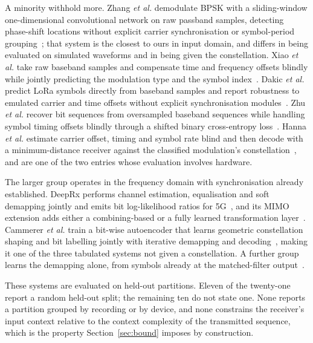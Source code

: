 \documentclass{ieeeaccess}
\begin{document}
A minority withhold more. Zhang \textit{et al.} demodulate BPSK with a
sliding-window one-dimensional convolutional network on raw passband samples,
detecting phase-shift locations without explicit carrier synchronisation or
symbol-period grouping~\cite{Zhang2018Enhanced}; that system is the closest to
ours in input domain, and differs in being evaluated on simulated waveforms and
in being given the constellation. Xiao \textit{et al.} take raw baseband samples
and compensate time and frequency offsets blindly while jointly predicting the
modulation type and the symbol index~\cite{Xiao2023_UnifiedDeep}. Dakic
\textit{et al.} predict LoRa symbols directly from baseband samples and report
robustness to emulated carrier and time offsets without explicit synchronisation
modules~\cite{dakic2021LoRa}. Zhu \textit{et al.} recover bit sequences from
oversampled baseband sequences while handling symbol timing offsets blindly
through a shifted binary cross-entropy loss~\cite{Zhu2022EndtoEnd}. Hanna
\textit{et al.} estimate carrier offset, timing and symbol rate blind and then
decode with a minimum-distance receiver against the classified modulation's
constellation~\cite{Hanna2022SignalProcessing}, and are one of the two entries
whose evaluation involves hardware.

The larger group operates in the frequency domain with synchronisation already
established. DeepRx performs channel estimation, equalisation and soft demapping
jointly and emits bit log-likelihood ratios for
5G~\cite{honkala2021deeprxfullyconvolutionaldeep}, and its MIMO extension adds
either a combining-based or a fully learned transformation
layer~\cite{korpi2021UplinkCNN}. Cammerer \textit{et al.} train a bit-wise
autoencoder that learns geometric constellation shaping and bit labelling
jointly with iterative demapping and decoding~\cite{cammerer2020trainableCS},
making it one of the three tabulated systems not given a constellation. A
further group learns the demapping alone, from symbols already at the
matched-filter output~\cite{Zheng2022DemodNet, alwin2024LLRSymNet,
ganse2024MLApprochDemapping, polvani2021MIMO}.

These systems are evaluated on held-out partitions. Eleven of the twenty-one
report a random held-out split; the remaining ten do not state one. None
reports a partition grouped by recording or by device, and none constrains the
receiver's input context relative to the context complexity of the transmitted
sequence, which is the property Section~\ref{sec:bound} imposes by
construction.
\end{document}
